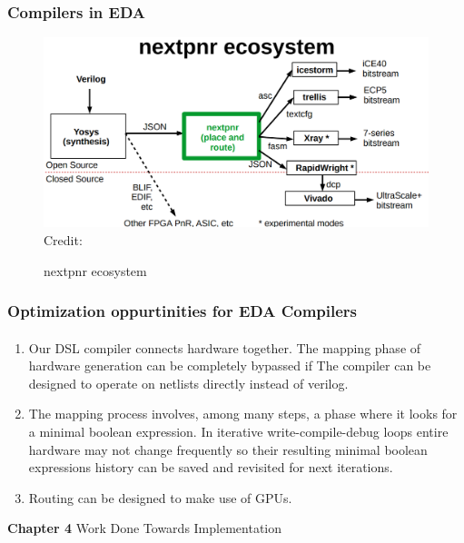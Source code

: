 \documentclass{beamer}
\begin{document}
{\begin{frame}[fragile]
   \frametitle{Compilers in EDA}
     \begin{figure}
         \centering
	 \includegraphics[width=1\linewidth]{images/nextpnr_ecosystem.png}
	 \hspace*{1pt}\hbox{\scriptsize Credit:}
	 \caption{nextpnr ecosystem}
	 \label{exa_nextpnr}
     \end{figure}
\end{frame}


\begin{frame}[fragile]
  \frametitle{Optimization oppurtinities for EDA Compilers}
  \framesubtitle{}
  \begin{enumerate}
    \item Our DSL compiler connects hardware together. The mapping phase
      of hardware generation can be completely bypassed if The compiler can
      be designed to operate on netlists directly instead of verilog.
    \item The mapping process involves, among many steps, a phase where it looks
      for a minimal boolean expression. In iterative write-compile-debug loops
      entire hardware may not change frequently so their resulting minimal
      boolean expressions history can be saved and revisited for next
      iterations.
    \item Routing can be designed to make use of GPUs.
  \end{enumerate}
\end{frame}

\begin{frame}[c,fragile]

  \centering
  \textbf{Chapter 4}
  Work Done Towards Implementation
\end{frame}

}
\end{document}
